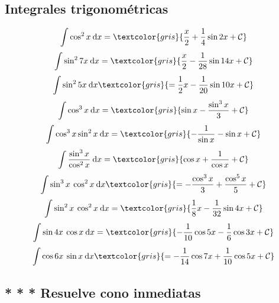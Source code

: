 {\begin{fleqn}
	\subsection*{Integrales trigonométricas}

	\begin{equation}
		\int \cos^2x\:\mathrm{d}x=\textcolor{gris}{\frac x 2 + \frac 1 4 \sin 2x + \mathcal C}
	\end{equation}
	\begin{equation}
		\int \sin^2 7x \:\mathrm{d}x=\textcolor{gris}{\frac x 2-\frac 1 {28}\sin 14x+\mathcal C }
	\end{equation}
	\begin{equation}
		\int \sin^2 5x \:\mathrm{d}x\textcolor{gris}{= \frac 1 2 x- \frac 1 {20}\sin 10x+\mathcal C}
	\end{equation}
	\begin{equation}
		\int \cos^3 x \:\mathrm{d}x=\textcolor{gris}{\sin x-\frac{\sin^3 x}{3}+\mathcal C}
	\end{equation}
	\begin{equation}
		\int \cos^3 x \sin^2 x \:\mathrm{d}x=\textcolor{gris}{-\dfrac {1}{\sin x}-\sin x +\mathcal C}
	\end{equation}
	\begin{equation}
		\int \frac{\sin^3 x}{\cos^2 x}\:\mathrm{d}x=\textcolor{gris}{\cos x+\frac{1}{\cos x}+\mathcal C}
	\end{equation}
	\begin{equation}
		\int \sin^3 x \: \cos^2 x \:\mathrm{d}x\textcolor{gris}{=-\frac{\cos^3 x}{3}+\frac{\cos^5 x}{5}+\mathcal C}
	\end{equation}
	\begin{equation}
		\int \sin^2 x \: \cos^2 x \:\mathrm{d}x=\textcolor{gris}{\frac 1 8 x- \frac 1 {32} \sin 4x + \mathcal C}
	\end{equation}
	\begin{equation}
		\int \sin 4x \: \cos x \:\mathrm{d}x=\textcolor{gris}{-\frac 1 {10}\cos 5x - \frac 1 6 \cos 3x + \mathcal C}
	\end{equation}
	\begin{equation}
		\int \cos 6x\: \sin x \:\mathrm{d}x\textcolor{gris}{=-\frac 1 {14}\cos 7x+\frac 1 {10} \cos 5x+\mathcal C}
	\end{equation}
	
	\subsection*{* * * Resuelve cono inmediatas}
	

\end{fleqn}}
